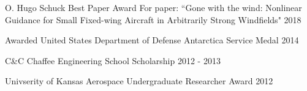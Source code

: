 
\begin{cvhonors}
\vspace*{-9pt}

  \cvawardentry
    {O. Hugo Schuck Best Paper Award \quad{}} %
    {For paper: ``Gone with the wind: Nonlinear Guidance for Small Fixed-wing Aircraft in Arbitrarily Strong Windfields"} %
    {2018} %

  \cvawardentry
    {Awarded United States Department of Defense Antarctica Service Medal} %
    {} %
    {2014} %


%
  \cvawardentry
    {C\&C Chaffee Engineering School Scholarship} %
    {} %
    {2012 - 2013} %


  \cvawardentry
    {Univserity of Kansas Aerospace Undergraduate Researcher Award} %
    {} %
    {2012} %

\end{cvhonors}
